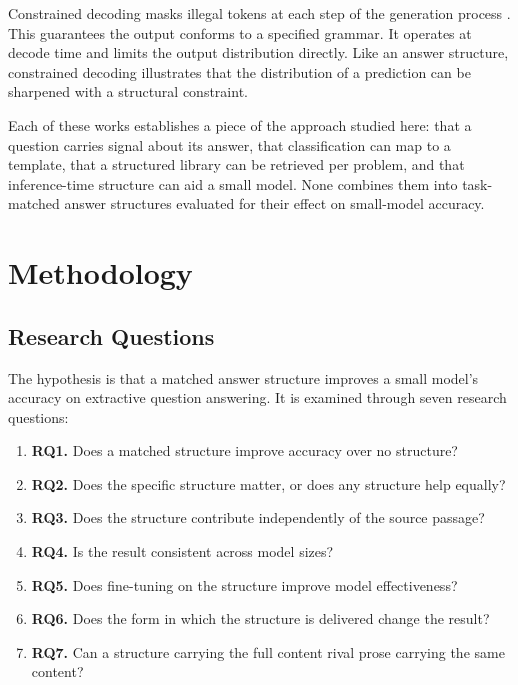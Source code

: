 \documentclass[master]{thesis}
\begin{document}
Constrained decoding masks illegal tokens at each step of the generation process \cite{willard2023guided}. This guarantees the output conforms to a specified grammar. It operates at decode time and limits the output distribution directly. Like an answer structure, constrained decoding illustrates that the distribution of a prediction can be sharpened with a structural constraint.

Each of these works establishes a piece of the approach studied here: that a question carries signal about its answer, that classification can map to a template, that a structured library can be retrieved per problem, and that inference-time structure can aid a small model. None combines them into task-matched answer structures evaluated for their effect on small-model accuracy.

\chapter{Methodology}
\label{ch:method}

\section{Research Questions}

The hypothesis is that a matched answer structure improves a small model's accuracy on extractive question answering. It is examined through seven research questions:

\begin{enumerate}
  \item \textbf{RQ1.} Does a matched structure improve accuracy over no structure?
  \item \textbf{RQ2.} Does the specific structure matter, or does any structure help equally?
  \item \textbf{RQ3.} Does the structure contribute independently of the source passage?
  \item \textbf{RQ4.} Is the result consistent across model sizes?
  \item \textbf{RQ5.} Does fine-tuning on the structure improve model effectiveness?
  \item \textbf{RQ6.} Does the form in which the structure is delivered change the result?
  \item \textbf{RQ7.} Can a structure carrying the full content rival prose carrying the same content?
\end{enumerate}
\end{document}
